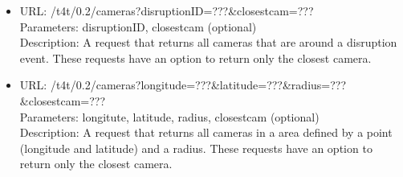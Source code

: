\begin{itemize}
\item URL: /t4t/0.2/cameras?disruptionID=???\&closestcam=??? \\
Parameters: disruptionID, closestcam (optional) \\
Description: A request that returns all cameras that are around a disruption event. These requests have an option to return only the closest camera.
\item URL: /t4t/0.2/cameras?longitude=???\&latitude=???\&radius=???\&closestcam=??? \\
Parameters: longitute, latitude, radius, closestcam (optional) \\
Description: A request that returns all cameras in a area defined by a point (longitude and latitude) and a radius. These requests have an option to return only the closest camera.
\end{itemize}
